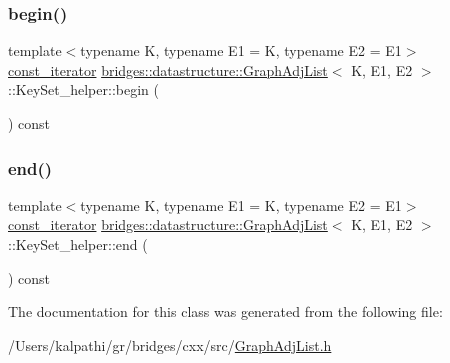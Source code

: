 \subsubsection{\texorpdfstring{begin()}{begin()}}
{\footnotesize\ttfamily template$<$typename K, typename E1 = K, typename E2 = E1$>$ \\
\mbox{\hyperlink{classbridges_1_1datastructure_1_1_graph_adj_list_1_1_key_set__helper_1_1const__iterator}{const\+\_\+iterator}} \mbox{\hyperlink{classbridges_1_1datastructure_1_1_graph_adj_list}{bridges\+::datastructure\+::\+Graph\+Adj\+List}}$<$ K, E1, E2 $>$\+::Key\+Set\+\_\+helper\+::begin (\begin{DoxyParamCaption}{ }\end{DoxyParamCaption}) const\hspace{0.3cm}{\ttfamily [inline]}}

\mbox{\label{classbridges_1_1datastructure_1_1_graph_adj_list_1_1_key_set__helper_a6204f2d6c81b2b4cc72387cbce6c4f0d}} 
\subsubsection{\texorpdfstring{end()}{end()}}
{\footnotesize\ttfamily template$<$typename K, typename E1 = K, typename E2 = E1$>$ \\
\mbox{\hyperlink{classbridges_1_1datastructure_1_1_graph_adj_list_1_1_key_set__helper_1_1const__iterator}{const\+\_\+iterator}} \mbox{\hyperlink{classbridges_1_1datastructure_1_1_graph_adj_list}{bridges\+::datastructure\+::\+Graph\+Adj\+List}}$<$ K, E1, E2 $>$\+::Key\+Set\+\_\+helper\+::end (\begin{DoxyParamCaption}{ }\end{DoxyParamCaption}) const\hspace{0.3cm}{\ttfamily [inline]}}



The documentation for this class was generated from the following file\+:\begin{DoxyCompactItemize}
\item 
/\+Users/kalpathi/gr/bridges/cxx/src/\mbox{\hyperlink{_graph_adj_list_8h}{Graph\+Adj\+List.\+h}}\end{DoxyCompactItemize}
